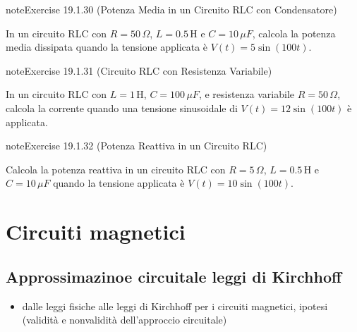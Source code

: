 \documentclass[letterpaper,10pt,italian]{jupyterBook}
\begin{document}
\begin{sphinxadmonition}{note}{Exercise 19.1.30 (Potenza Media in un Circuito RLC con Condensatore)}



\sphinxAtStartPar
In un circuito RLC con \(R = 50 \, \Omega\), \(L = 0.5 \, \text{H}\) e \(C = 10 \, \mu F\), calcola la potenza media dissipata quando la tensione applicata è \(V(t) = 5 \sin(100 t)\).
\end{sphinxadmonition}
 \label{exercise:ch/electromagnetism/circuits-electric-problems-exercise-30}

\begin{sphinxadmonition}{note}{Exercise 19.1.31 (Circuito RLC con Resistenza Variabile)}



\sphinxAtStartPar
In un circuito RLC con \(L = 1 \, \text{H}\), \(C = 100 \, \mu F\), e resistenza variabile \(R = 50 \, \Omega\), calcola la corrente quando una tensione sinusoidale di \(V(t) = 12 \sin(100 t)\) è applicata.
\end{sphinxadmonition}
 \label{exercise:ch/electromagnetism/circuits-electric-problems-exercise-31}

\begin{sphinxadmonition}{note}{Exercise 19.1.32 (Potenza Reattiva in un Circuito RLC)}



\sphinxAtStartPar
Calcola la potenza reattiva in un circuito RLC con \(R = 5 \, \Omega\), \(L = 0.5 \, \text{H}\) e \(C = 10 \, \mu F\) quando la tensione applicata è \(V(t) = 10 \sin(100 t)\).
\end{sphinxadmonition}

\sphinxstepscope


\section{Circuiti magnetici}
\label{\detokenize{ch/electromagnetism/circuits-magnetic:circuiti-magnetici}}\label{\detokenize{ch/electromagnetism/circuits-magnetic:physics-hs-electromagnetism-circuits-magnetic}}\label{\detokenize{ch/electromagnetism/circuits-magnetic::doc}}

\subsection{Approssimazinoe circuitale \sphinxhyphen{} leggi di Kirchhoff}
\label{\detokenize{ch/electromagnetism/circuits-magnetic:approssimazinoe-circuitale-leggi-di-kirchhoff}}\begin{itemize}
\item {} 
\sphinxAtStartPar
dalle leggi fisiche alle leggi di Kirchhoff per i circuiti magnetici, ipotesi (validità e non\sphinxhyphen{}validità dell’approccio circuitale)

\end{itemize}
\end{document}
